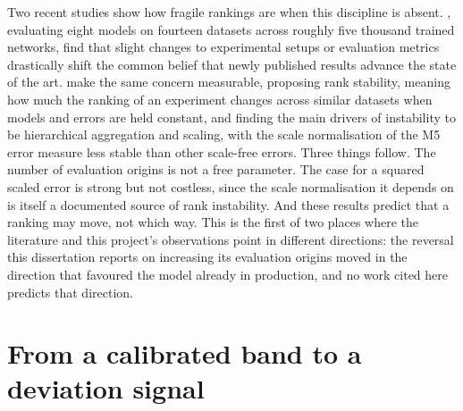 Two recent studies show how fragile rankings are when this discipline is absent.
\citet{brigato_there_2025}, evaluating eight models on fourteen datasets across
roughly five thousand trained networks, find that slight changes to experimental
setups or evaluation metrics drastically shift the common belief that newly
published results advance the state of the art.
\citet{hewamalage_look_2021} make the same concern measurable, proposing rank
stability, meaning how much the ranking of an experiment changes across similar
datasets when models and errors are held constant, and finding the main drivers
of instability to be hierarchical aggregation and scaling, with the scale
normalisation of the M5 error measure less stable than other scale-free errors.
Three things follow. The number of evaluation origins is not a free parameter.
The case for a squared scaled error is strong but not costless, since the scale
normalisation it depends on is itself a documented source of rank instability.
And these results predict that a ranking may move, not which way. This is the
first of two places where the literature and this project's observations point in
different directions: the reversal this dissertation reports on increasing its
evaluation origins moved in the direction that favoured the model already in
production, and no work cited here predicts that direction.

\section{From a calibrated band to a deviation signal}
\label{sec:rw-deviation}

